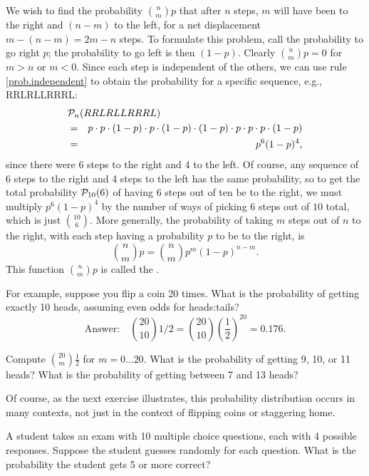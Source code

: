 We wish to find the probability $\binom{n}{m}{p}$ that after $n$ steps, $m$ will have been to the right and $(n-m)$ to the left, for a net displacement $m-(n-m) = 2m-n$ steps.
To formulate this problem, call the probability to go right $p$; the probability to go left is then $(1-p)$.
Clearly $\binom{n}{m}{p} = 0$ for $m>n$ or $m<0$. Since each step is independent of the others, we can use rule \ref{prob.independent} to obtain the probability for a specific sequence, e.g., RRLRLLRRRL:
\begin{eqnarray}
	\lefteqn{\prob_{n}(RRLRLLRRRL) } \nonumber\\
	&=& p\cdot p\cdot(1-p)\cdot p\cdot(1-p)\cdot(1-p)\cdot p\cdot p\cdot p\cdot(1-p) \nonumber\\
	&=& p^{6}(1-p)^{4}
\label{e.one-sequence},
\end{eqnarray}
since there were 6 steps to the right and 4 to the left. Of course, any sequence of 6 steps to the right and 4 steps to the left has the same probability, so to get the total probability $\mathcal{P}_{10}(6)$ of having 6 steps out of ten be to the right, we must multiply $p^{6}(1-p)^{4}$ by the number of ways of picking $6$ steps out of $10$ total, which is just $10\choose6$.  More generally, the probability of taking $m$ steps out of $n$ to the right, with each step having a probability $p$ to be to the right, is
\begin{equation}\label{e.binomial}
	\binom{n}{m}{p} = {n\choose m} p^{m}(1-p)^{n-m}.
\end{equation}
This function $\binom{n}{m}{p}$ is called the .

For example, suppose you flip a coin 20 times.  What is the probability of getting exactly 10 heads, assuming even odds for heads:tails?
\[
	\textrm{Answer:}\quad\binom{20}{10}{1/2} = {20\choose10} \left(\frac{1}{2}\right)^{20} = 0.176.
\]
\begin{exercisebox}
\label{e.prob-distribution}
Compute $\binom{20}{m}{\frac{1}{2}}$ for $m = 0\ldots20$.  What is the probability of getting 9, 10, or 11 heads?  What is the probability of getting between 7 and 13 heads?
\end{exercisebox}

Of course, as the next exercise illustrates, this probability distribution occurs in many contexts, not just in the context of flipping coins or staggering home.

\begin{exercisebox}
A student takes an exam with 10 multiple choice questions, each with 4 possible responses.  Suppose the student guesses randomly for each question.  What is the probability the student gets 5 or more correct?
\end{exercisebox}

